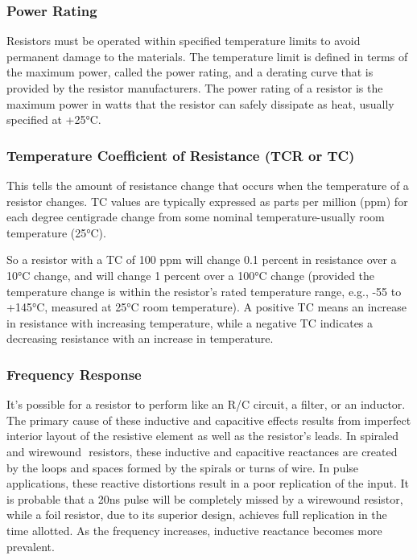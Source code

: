 \documentclass[../../document]{subfiles}
\begin{document}
\subsubsection{Power Rating}
Resistors must be operated within specified temperature limits to avoid
permanent damage to the materials. The temperature limit is defined in terms of
the maximum power, called the power rating, and a derating curve that is
provided by the resistor manufacturers. The power rating of a resistor is the
maximum power in watts that the resistor can safely dissipate as heat, usually
specified at +25\unit{\celsius}. \cite{practical_electronics}

\subsubsection{Temperature Coefficient of Resistance (TCR or TC)}
This tells the amount of resistance change that occurs when the temperature of
a resistor changes. TC values are typically expressed as parts per million
(ppm) for each degree centigrade change from some nominal temperature-usually
room temperature (25\unit{\celsius}). \cite{practical_electronics}

So a resistor with a TC of 100 ppm will change 0.1 percent in resistance over a
10\unit{\celsius} change, and will change 1 percent over a 100\unit{\celsius}
change (provided the temperature change is within the resistor’s rated
temperature range, e.g., -55 to +145\unit{\celsius}, measured at
25\unit{\celsius} room temperature). A positive TC means an increase in
resistance with increasing temperature, while a negative TC indicates a
decreasing resistance with an increase in temperature.
\cite{practical_electronics}

\subsubsection{Frequency Response}
It’s possible for a resistor to perform like an R/C circuit, a filter, or an
inductor. The primary cause of these inductive and capacitive effects results
from imperfect interior layout of the resistive element as well as the
resistor’s leads. In spiraled and wirewound ­ resistors, these inductive and
capacitive reactances are created by the loops and spaces formed by the spirals
or turns of wire. In pulse applications, these reactive distortions result in a
poor replication of the input. It is probable that a 20\unit{\nano\second}
pulse will be completely missed by a wirewound resistor, while a foil resistor,
due to its superior design, achieves full replication in the time allotted. As
the frequency increases, inductive reactance becomes more prevalent.
\cite{practical_electronics}
\end{document}
